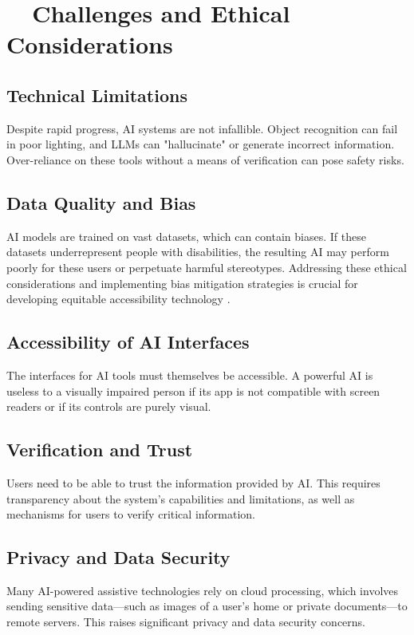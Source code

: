 \section{~~Challenges and Ethical Considerations}\label{ch9:sec:challenges}

\subsection{Technical Limitations}\label{ch9:ssec:technical-limitations}
Despite rapid progress, AI systems are not infallible. Object recognition can fail in poor lighting, and LLMs can "hallucinate" or generate incorrect information. Over-reliance on these tools without a means of verification can pose safety risks.

\subsection{Data Quality and Bias}\label{ch9:ssec:data-bias}
AI models are trained on vast datasets, which can contain biases. If these datasets underrepresent people with disabilities, the resulting AI may perform poorly for these users or perpetuate harmful stereotypes. Addressing these ethical considerations and implementing bias mitigation strategies is crucial for developing equitable accessibility technology \supercite{AIEthicsBias}.

\subsection{Accessibility of AI Interfaces}\label{ch9:ssec:ai-interfaces}
The interfaces for AI tools must themselves be accessible. A powerful AI is useless to a visually impaired person if its app is not compatible with screen readers or if its controls are purely visual.

\subsection{Verification and Trust}\label{ch9:ssec:verification-trust}
Users need to be able to trust the information provided by AI. This requires transparency about the system's capabilities and limitations, as well as mechanisms for users to verify critical information.

\subsection{Privacy and Data Security}\label{ch9:ssec:privacy}
Many AI-powered assistive technologies rely on cloud processing, which involves sending sensitive data—such as images of a user's home or private documents—to remote servers. This raises significant privacy and data security concerns.

